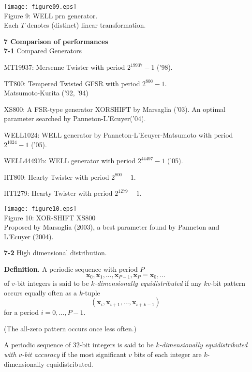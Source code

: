 \documentclass[a4j,12pt,landscape]{jarticle}
\def\bx{{{\mathbf x}}}
\begin{document}
{\begin{center}
\texttt{[image: figure09.eps]}
\\
Figure 9: WELL prn generator.
\\
Each $T$ denotes (distinct) linear transformation.
\end{center}

\newpage
\noindent
{\bf 7 Comparison of performances}
\\
{\bf 7-1} Compared Generators 
\begin{description}
\item MT19937: Mersenne Twister with period $2^{19937}-1$ ('98).
\item TT800: Tempered Twisted GFSR with period $2^{800}-1$. \\
Matsumoto-Kurita ('92, '94)
\item XS800: A FSR-type generator XORSHIFT by Marsaglia ('03).
 An optimal parameter searched by Panneton-L'Ecuyer('04).
\item WELL1024: WELL generator by Panneton-L'Ecuyer-Matsumoto with period $2^{1024}-1$ ('05).
\item WELL44497b: WELL generator with period $2^{44497}-1$ ('05).
\item HT800: Hearty Twister with period $2^{800}-1$.
\item HT1279: Hearty Twister with period $2^{1279}-1$.
\end{description}
\newpage

\begin{center}
\texttt{[image: figure10.eps]}
\\
Figure 10: XOR-SHIFT XS800
\\
Proposed by Marsaglia (2003), a best parameter
found by Panneton and L'Ecuyer (2004). 
\end{center}

\newpage
\noindent
{\bf 7-2} High dimensional distribution.

{\bf Definition.} 
A periodic sequence with period $P$
$$\bx_0, \bx_1, \ldots, \bx_{P-1}, \bx_P=\bx_0, \ldots$$
of $v$-bit integers is said to be {\em $k$-dimensionally equidistributed}
if any $kv$-bit pattern occurs equally often as a $k$-tuple
$$
(\bx_i, \bx_{i+1}, \ldots, \bx_{i+k-1})
$$
for a period $i=0,\ldots, P-1$. 

(The all-zero pattern occurs once less often.)

\newpage
A periodic sequence of 32-bit integers is said to be
{\em $k$-dimensionally equidistributed with $v$-bit accuracy}
if the most significant $v$ bits of each integer are
$k$-dimensionally equidistributed. 

}
\end{document}

